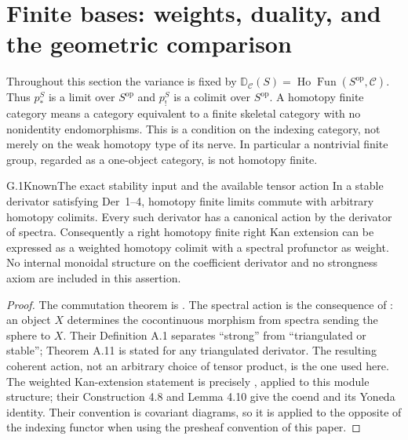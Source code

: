 \section{Finite bases: weights, duality, and the geometric comparison}

Throughout this section the variance is fixed by
$\mathbb D_{\mathcal C}(S)=\operatorname{Ho}\operatorname{Fun}(S^{\mathrm{op}},\mathcal C)$.
Thus $p_*^S$ is a limit over $S^{\mathrm{op}}$ and $p_!^S$ is a
colimit over $S^{\mathrm{op}}$. A homotopy finite category means a
category equivalent to a finite skeletal category with no nonidentity
endomorphisms. This is a condition on the indexing category, not merely
on the weak homotopy type of its nerve. In particular a nontrivial
finite group, regarded as a one-object category, is not homotopy finite.

\begin{claim}{G.1}{Known}{The exact stability input and the available tensor action}
In a stable derivator satisfying Der~1--4, homotopy finite limits
commute with arbitrary homotopy colimits. Every such derivator has a
canonical action by the derivator of spectra. Consequently a right
homotopy finite right Kan extension can be expressed as a weighted
homotopy colimit with a spectral profunctor as weight. No internal
monoidal structure on the coefficient derivator and no strongness
axiom are included in this assertion.
\end{claim}
\begin{proof}
The commutation theorem is \citet[Theorem 2.14]{DGGrothShulman2017}.
The spectral action is the consequence of
\citet[Theorem A.11 and Appendix A.3]{DGCisinskiTabuada2011}:
an object $X$ determines the cocontinuous morphism from spectra sending
the sphere to $X$. Their Definition A.1 separates ``strong'' from
``triangulated or stable''; Theorem A.11 is stated for any triangulated
derivator. The resulting coherent action, not an arbitrary choice of
tensor product, is the one used here. The weighted Kan-extension
statement is precisely \citet[Theorem 4.11(iv)]{DGGrothShulman2017},
applied to this module structure; their Construction 4.8 and Lemma 4.10
give the coend and its Yoneda identity. Their convention is covariant
diagrams, so it is applied to the opposite of the indexing functor
when using the presheaf convention of this paper.
\end{proof}

